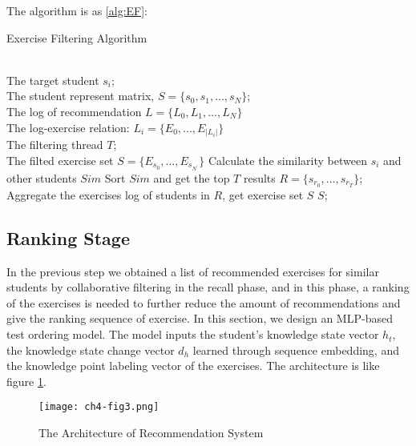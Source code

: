 The algorithm is as \ref{alg:EF}:
\begin{algorithm}[h]
  \caption{Exercise Filtering Algorithm}
  \label{alg:EF}
  \begin{algorithmic}
    \REQUIRE ~~\\
    The target student $s_i$; \\
    The student represent matrix, $S=\{s_0,s_1,...,s_N\}$;\\
    The log of recommendation $L=\{L_0,L_1,...,L_N\}$ \\
    The log-exercise relation: $L_i=\{E_0,...,E_{|L_i|}\}$\\
    The filtering thread $T$;
    \ENSURE ~~\\ %
    The filted exercise set $S=\{E_{s_0},...,E_{s_{N^'}}\}$
    \STATE Calculate the similarity between $s_i$ and other students $Sim$
    \STATE Sort $Sim$ and get the top $T$ results $R=\{s_{r_0},...,s_{r_T}\}$;
    \STATE Aggregate the exercises log of students in $R$, get exercise set $S$
    \RETURN $S$; %
  \end{algorithmic}
\end{algorithm}




\subsection{Ranking Stage}

In the previous step we obtained a list of recommended exercises for similar students by collaborative filtering in the recall phase, and in this phase, a ranking of the exercises is needed to further reduce the amount of recommendations and give the ranking sequence of exercise. In this section, we design an MLP-based test ordering model. The model inputs the student's knowledge state vector $h_t$, the knowledge state change vector $d_h$ learned through sequence embedding, and the knowledge point labeling vector of the exercises. The architecture is like figure \ref{fig:ch4-fig3}.


\begin{figure}[h]
  \centering
  \texttt{[image: ch4-fig3.png]}
  \caption{The Architecture of Recommendation System}
  \label{fig:ch4-fig3}
\end{figure}

